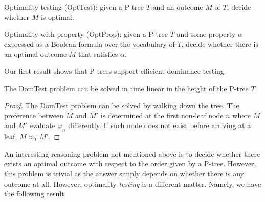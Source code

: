 \begin{definition}
\label{def:opt_test}
  Optimality-testing ({\sc OptTest}): given a P-tree $T$ and an outcome $M$ of $T$,
  decide whether $M$ is optimal.
\end{definition}

\begin{definition}
\label{def:opt_prop}
  Optimality-with-property ({\sc OptProp}): given a P-tree $T$ and some property $\alpha$ 
	expressed as a Boolean formula 
	over the vocabulary of $T$,
  decide whether there is an optimal outcome $M$ that satisfies $\alpha$.
\end{definition}

Our first result shows that P-trees support efficient dominance testing.
\begin{thm}
\label{thm:dom}
	The {\sc DomTest} problem can be solved in time linear in the
	height of the P-tree $T$.
\end{thm}
\begin{proof}
	The {\sc DomTest} problem can be solved by walking down the tree.
	The preference between $M$ and $M'$ is determined at the first non-leaf node
	$n$ where $M$ and $M'$ evaluate $\varphi_n$ differently.  If such
	node does not exist before arriving at a leaf, $M \approx_T M'$.
\end{proof}
An interesting reasoning problem not mentioned above is to decide whether 
there exists an optimal outcome with respect to the order given by a P-tree.
However, this problem is trivial as the answer simply depends on whether 
there is any outcome at all. However, optimality \emph{testing} is a 
different matter. Namely, we have the following result.

